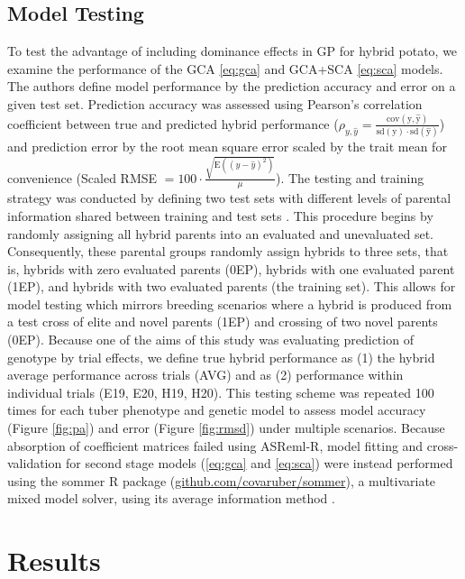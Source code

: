 \subsection{Model Testing}

To test the advantage of including dominance effects in GP for hybrid potato, we examine the performance of the GCA \eqref{eq:gca} and GCA+SCA \eqref{eq:sca} models. The authors define model performance by the prediction accuracy and error on a given test set. Prediction accuracy was assessed using Pearson's correlation coefficient between true and predicted hybrid performance (\(\rho_{y,\hat{y}} = \frac{\mathrm{cov(y,\hat{y})}}{\mathrm{sd(y)\cdot sd(\hat{y})}}\)) and prediction error by the root mean square error scaled by the trait mean for convenience (Scaled RMSE \(= 100\cdot\frac{\sqrt{\mathrm E((y-\hat{y})^2)}}{\mu}\)). The testing and training strategy was conducted by defining two test sets with different levels of parental information shared between training and test sets \cite{Schrag2009}. This procedure begins by randomly assigning all hybrid parents into an evaluated and unevaluated set. Consequently, these parental groups randomly assign hybrids to three sets, that is, hybrids with zero evaluated parents (0EP), hybrids with one evaluated parent (1EP), and hybrids with two evaluated parents (the training set). This allows for model testing which mirrors breeding scenarios where a hybrid is produced from a test cross of elite and novel parents (1EP) and crossing of two novel parents (0EP). Because one of the aims of this study was evaluating prediction of genotype by trial effects, we define true hybrid performance as (1) the hybrid average performance across trials (AVG) and as (2) performance within individual trials (E19, E20, H19, H20). This testing scheme was repeated 100 times for each tuber phenotype and genetic model to assess model accuracy (Figure \ref{fig:pa}) and error (Figure \ref{fig:rmsd}) under multiple scenarios. Because absorption of coefficient matrices failed using ASReml-R, model fitting and cross-validation for second stage models (\ref{eq:gca} and \ref{eq:sca}) were instead performed using the sommer R package (\href{https://github.com/covaruber/sommer}{github.com/covaruber/sommer}), a multivariate mixed model solver, using its average information method \cite{Covarrubias-Pazaran2016}.

\section{Results}

